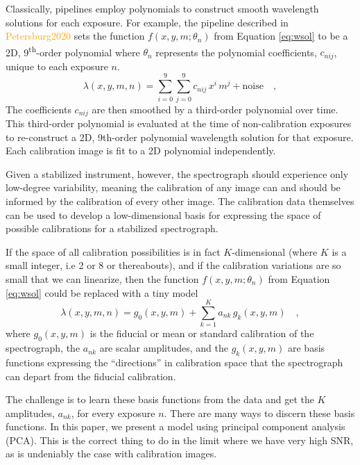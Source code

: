 \documentclass[twocolumn]{aastex63}
\newcommand{\lz}[1]{\textcolor{orange}{#1}}
\begin{document}
Classically, pipelines employ polynomials to construct smooth wavelength solutions for each exposure.  For example, the pipeline described in \lz{Petersburg2020} sets the function $f(x,y,m;\theta_{n})$ from Equation \ref{eq:wsol} to be a 2D, 9\textsuperscript{th}-order polynomial where $\theta_{n}$ represents the polynomial coefficients, $c_{nij}$, unique to each exposure $n$.
\begin{equation}
\lambda(x,y,m,n) = \sum_{i=0}^9\sum_{j=0}^9 c_{nij}\, x^i\,m^j + \mathrm{noise}
\quad ,
\label{eq:poly_wsol}
\end{equation}
The coefficients $c_{nij}$ are then smoothed by a third-order polynomial over time.  This third-order polynomial is evaluated at the time of non-calibration exposures to re-construct a 2D, 9th-order polynomial wavelength solution for that exposure.  Each calibration image is fit to a 2D polynomial independently.

Given a stabilized instrument, however, the spectrograph should experience only low-degree variability, meaning the calibration of any image can and should be informed by the calibration of every other image.  The calibration data themselves can be used to develop a low-dimensional basis for expressing the space of possible calibrations for a stabilized spectrograph.

If the space of all calibration possibilities is in fact $K$-dimensional (where $K$ is a small integer, i.e 2 or 8 or thereabouts), and if the calibration variations are so small that we can linearize, then the function $f(x,y,m;\theta_{n})$ from Equation \ref{eq:wsol} could be replaced with a tiny model
\begin{equation}
\lambda(x,y,m,n) = g_0(x,y,m) + \sum_{k=1}^K a_{nk}\,g_k(x,y,m)
\quad ,
\label{eq:excl_wsol}
\end{equation}
where
$g_0(x,y,m)$ is the fiducial or mean or standard calibration of the spectrograph,
the $a_{nk}$ are scalar amplitudes,
and the $g_k(x,y,m)$ are basis functions expressing the ``directions'' in calibration space that the spectrograph can depart from the fiducial calibration.

The challenge is to learn these basis functions from the data and get the $K$ amplitudes, $a_{nk}$, for every exposure $n$.  There are many ways to discern these basis functions.  In this paper, we present a model using principal component analysis (PCA).  This is the correct thing to do in the limit where we have very high SNR, as is undeniably the case with calibration images.
\end{document}
